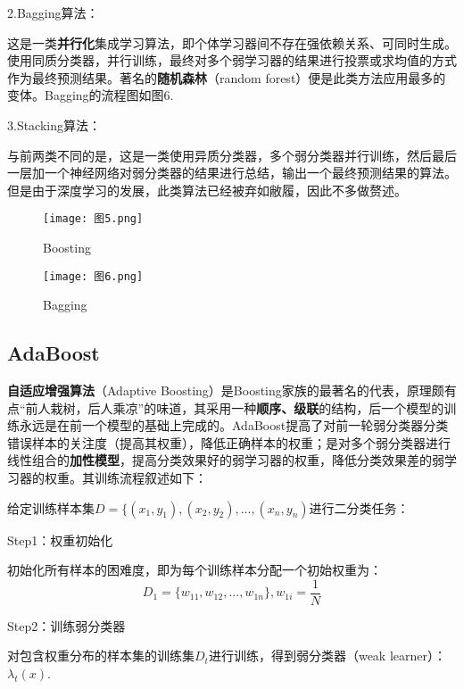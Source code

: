 2.Bagging算法：

这是一类\textbf{并行化}集成学习算法，即个体学习器间不存在强依赖关系、可同时生成。使用同质分类器，并行训练，最终对多个弱学习器的结果进行投票或求均值的方式作为最终预测结果。著名的\textbf{随机森林}（random forest）便是此类方法应用最多的变体。Bagging的流程图如图6.

3.Stacking算法：

与前两类不同的是，这是一类使用异质分类器，多个弱分类器并行训练，然后最后一层加一个神经网络对弱分类器的结果进行总结，输出一个最终预测结果的算法。但是由于深度学习的发展，此类算法已经被弃如敝履，因此不多做赘述。

\begin{figure}[h]
	\centering
	\begin{minipage}[b]{0.45\textwidth}
		\centering
		\texttt{[image: 图5.png]}
		\caption{Boosting}
		\label{fig:image1}
	\end{minipage}
	\hspace{0.05\textwidth} %
	\begin{minipage}[b]{0.45\textwidth}
		\centering
		\texttt{[image: 图6.png]}
		\caption{Bagging}
		\label{fig:image2}
	\end{minipage}
\end{figure}

\subsection{AdaBoost}
\textbf{自适应增强算法}（Adaptive Boosting）是Boosting家族的最著名的代表，原理颇有点“前人栽树，后人乘凉”的味道，其采用一种\textbf{顺序、级联}的结构，后一个模型的训练永远是在前一个模型的基础上完成的。AdaBoost提高了对前一轮弱分类器分类错误样本的关注度（提高其权重），降低正确样本的权重；是对多个弱分类器进行线性组合的\textbf{加性模型}，提高分类效果好的弱学习器的权重，降低分类效果差的弱学习器的权重。其训练流程叙述如下：

给定训练样本集$D=\{(x_1,y_1),(x_2,y_2),...,(x_n,y_n)$进行二分类任务：

Step1：权重初始化

初始化所有样本的困难度，即为每个训练样本分配一个初始权重为：
\begin{equation}D_1=\{w_{11},w_{12},...,w_{1n}\},w_{1i}=\frac{1}{N}\end{equation}

Step2：训练弱分类器

对包含权重分布的样本集的训练集$D_{t}$进行训练，得到弱分类器（weak learner）：$\lambda_t(x)$.

